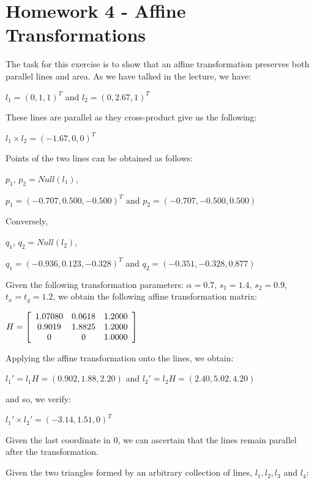 \documentclass[]{article}
\begin{document}
\vspace{0.5em}

\section{Homework 4 - Affine Transformations}

The task for this exercise is to show that an affine transformation preserves both parallel lines and area. As we have talked in the lecture, we have: 

\centerline {
	$l_1 = (0, 1, 1)^T$ and $l_2=(0,2.67,1)^T$
}

These lines are parallel as they cross-product give us the following:

\centerline {
	$l_1 \times l_2 = (-1.67, 0, 0)^T$
}

Points of the two lines can be obtained as follows:

\centerline {
	$p_1$, $p_2 = Null(l_1)$, 
}

\centerline {
	$p_1=(-0.707, 0.500, -0.500)^T$ and $p_2=(-0.707, -0.500, 0.500)$ 
}

Conversely, 

\centerline {
	$q_1$, $q_2 = Null(l_2)$, 
}

\centerline {
	$q_1=(-0.936, 0.123, -0.328)^T$ and $q_2=(-0.351, -0.328, 0.877)$ 
}

Given the following transformation parameters: $\alpha = 0.7$, $s_1=1.4$, $s_2=0.9$, $t_x=t_y=1.2$, we obtain the following affine transformation matrix:

\centerline {
	$H = \left[ {\begin{array}{*{20}c}
		1.07080 & 0.0618 & 1.2000 \\
		0.9019 & 1.8825 & 1.2000 \\
		0 & 0 & 1.0000
		\end{array} } \right] $
}

Applying the affine transformation onto the lines, we obtain:

\centerline {
	$l_1' = l_1H = (0.902, 1.88, 2.20)$ and $l_2' = l_2H = (2.40, 5.02, 4.20)$ 
}

and so, we verify:

\centerline {
	$l_1' \times l_2'=(-3.14, 1.51, 0)^T$
}

Given the last coordinate in 0, we can ascertain that the lines remain parallel after the transformation.

Given the two triangles formed by an arbitrary collection of lines, $l_1, l_2, l_3$ and $l_4$:
\end{document}

